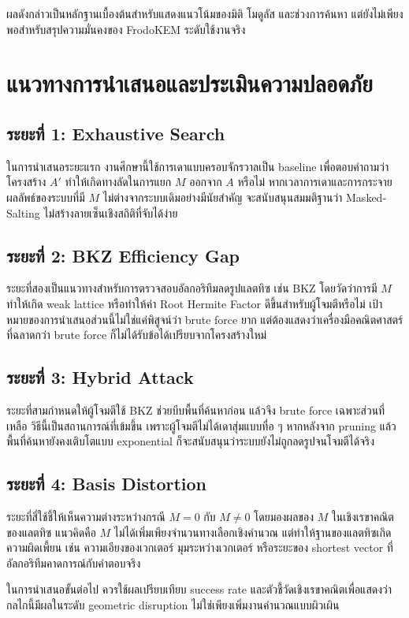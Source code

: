 \documentclass[14pt,a4paper]{extarticle}
\newcommand{\eng}[1]{\textenglish{#1}}
\begin{document}
ผลดังกล่าวเป็นหลักฐานเบื้องต้นสำหรับแสดงแนวโน้มของมิติ โมดูลัส และช่วงการค้นหา แต่ยังไม่เพียงพอสำหรับสรุปความมั่นคงของ FrodoKEM ระดับใช้งานจริง

\section{แนวทางการนำเสนอและประเมินความปลอดภัย}
\subsection{ระยะที่ 1: Exhaustive Search}
ในการนำเสนอระยะแรก งานศึกษานี้ใช้การเดาแบบครอบจักรวาลเป็น baseline เพื่อตอบคำถามว่าโครงสร้าง $A'$ ทำให้เกิดทางลัดในการแยก $M$ ออกจาก $A$ หรือไม่ หากเวลาการเดาและการกระจายผลลัพธ์ของระบบที่มี $M$ ไม่ต่างจากระบบเดิมอย่างมีนัยสำคัญ จะสนับสนุนสมมติฐานว่า \eng{Masked-Salting} ไม่สร้างลายเซ็นเชิงสถิติที่จับได้ง่าย

\subsection{ระยะที่ 2: BKZ Efficiency Gap}
ระยะที่สองเป็นแนวทางสำหรับการตรวจสอบอัลกอริทึมลดรูปแลตทิซ เช่น \eng{BKZ} โดยวัดว่าการมี $M$ ทำให้เกิด weak lattice หรือทำให้ค่า \eng{Root Hermite Factor} ดีขึ้นสำหรับผู้โจมตีหรือไม่ เป้าหมายของการนำเสนอส่วนนี้ไม่ใช่แค่พิสูจน์ว่า brute force ยาก แต่ต้องแสดงว่าเครื่องมือคณิตศาสตร์ที่ฉลาดกว่า brute force ก็ไม่ได้รับข้อได้เปรียบจากโครงสร้างใหม่

\subsection{ระยะที่ 3: Hybrid Attack}
ระยะที่สามกำหนดให้ผู้โจมตีใช้ BKZ ช่วยบีบพื้นที่ค้นหาก่อน แล้วจึง brute force เฉพาะส่วนที่เหลือ วิธีนี้เป็นสถานการณ์ที่เข้มขึ้น เพราะผู้โจมตีไม่ได้เดาสุ่มแบบทื่อ ๆ หากหลังจาก pruning แล้วพื้นที่ค้นหายังคงเติบโตแบบ exponential ก็จะสนับสนุนว่าระบบยังไม่ถูกลดรูปจนโจมตีได้จริง

\subsection{ระยะที่ 4: Basis Distortion}
ระยะที่สี่ใช้ชี้ให้เห็นความต่างระหว่างกรณี $M=0$ กับ $M\neq0$ โดยมองผลของ $M$ ในเชิงเรขาคณิตของแลตทิซ แนวคิดคือ $M$ ไม่ได้เพิ่มเพียงจำนวนทางเลือกเชิงคำนวณ แต่ทำให้ฐานของแลตทิซเกิดความผิดเพี้ยน เช่น ความเอียงของเวกเตอร์ มุมระหว่างเวกเตอร์ หรือระยะของ shortest vector ที่อัลกอริทึมคาดการณ์กับคำตอบจริง

ในการนำเสนอขั้นต่อไป ควรใช้ผลเปรียบเทียบ success rate และตัวชี้วัดเชิงเรขาคณิตเพื่อแสดงว่ากลไกนี้มีผลในระดับ \eng{geometric disruption} ไม่ใช่เพียงเพิ่มงานคำนวณแบบผิวเผิน
\end{document}
